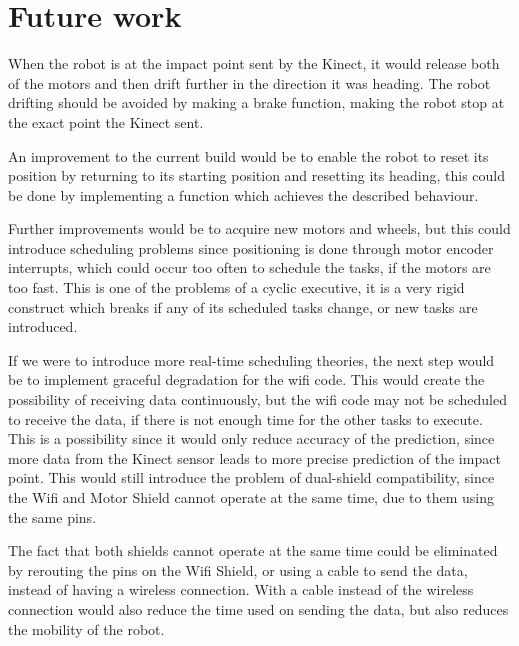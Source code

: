 \chapter{Future work}
\label{chap:FutureWork}
When the robot is at the impact point sent by the Kinect, it would release both of the motors and then drift further in the direction it was heading. The robot drifting should be avoided by making a brake function, making the robot stop at the exact point the Kinect sent.

An improvement to the current build would be to enable the robot to reset its position by returning to its starting position and resetting its heading, this could be done by implementing a function which achieves the described behaviour.

Further improvements would be to acquire new motors and wheels, but this could introduce scheduling problems since positioning is done through motor encoder interrupts, which could occur too often to schedule the tasks, if the motors are too fast.
This is one of the problems of a cyclic executive, it is a very rigid construct which breaks if any of its scheduled tasks change, or new tasks are introduced.

If we were to introduce more real-time scheduling theories, the next step would be to implement graceful degradation for the wifi code. This would create the possibility of receiving data continuously, but the wifi code may not be scheduled to receive the data, if there is not enough time for the other tasks to execute. This is a possibility since it would only reduce accuracy of the prediction, since more data from the Kinect sensor leads to more precise prediction of the impact point. This would still introduce the problem of dual-shield compatibility, since the Wifi and Motor Shield cannot operate at the same time, due to them using the same pins.

The fact that both shields cannot operate at the same time could be eliminated by rerouting the pins on the Wifi Shield, or using a cable to send the data, instead of having a wireless connection. With a cable instead of the wireless connection would also reduce the time used on sending the data, but also reduces the mobility of the robot.
